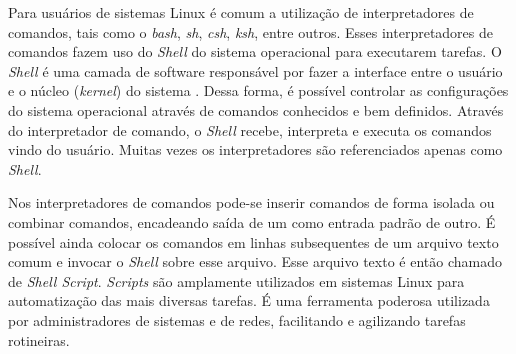 \documentclass[	12pt, Times, openright, twoside, a4paper, english, brazil]{abntex2}
\begin{document}


Para usuários de sistemas Linux é comum a utilização de interpretadores de comandos, tais como o \textit{bash}, \textit{sh}, \textit{csh}, \textit{ksh}, entre outros. Esses interpretadores de comandos fazem uso do \textit{Shell} do sistema operacional para executarem tarefas. O \textit{Shell} é uma camada de software responsável por fazer a interface entre o usuário e o núcleo (\textit{kernel}) do sistema \cite{shell_script-taylor}. Dessa forma, é possível controlar as configurações do sistema operacional através de comandos conhecidos e bem definidos. Através do interpretador de comando, o \textit{Shell} recebe, interpreta e executa os comandos vindo do usuário. Muitas vezes os interpretadores são referenciados apenas como \textit{Shell}. \cite{jargas2008shell}


Nos interpretadores de comandos pode-se inserir comandos de forma isolada ou combinar comandos, encadeando saída de um como entrada padrão de outro. É possível ainda colocar os comandos em linhas subsequentes de um arquivo texto comum e invocar o \textit{Shell} sobre esse arquivo. Esse arquivo texto é então chamado de \textit{Shell Script}. \textit{Scripts} são amplamente utilizados em sistemas Linux para automatização das mais diversas tarefas. É uma ferramenta poderosa utilizada por administradores de sistemas e de redes, facilitando e agilizando tarefas rotineiras.
\end{document}

